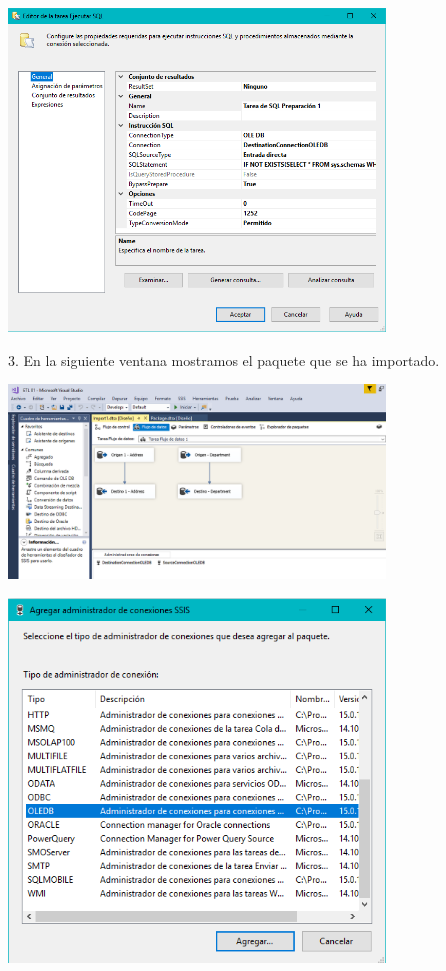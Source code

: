 	\begin{center}
	\includegraphics[width=10cm]{imagenes/img16}
	\end{center}	

3. En la siguiente ventana mostramos el paquete que se ha importado.
	\begin{center}
	\includegraphics[width=10cm]{imagenes/img17}
    \end{center}	
    
	\begin{center}
	\includegraphics[width=10cm]{imagenes/img18}
	\end{center}	

